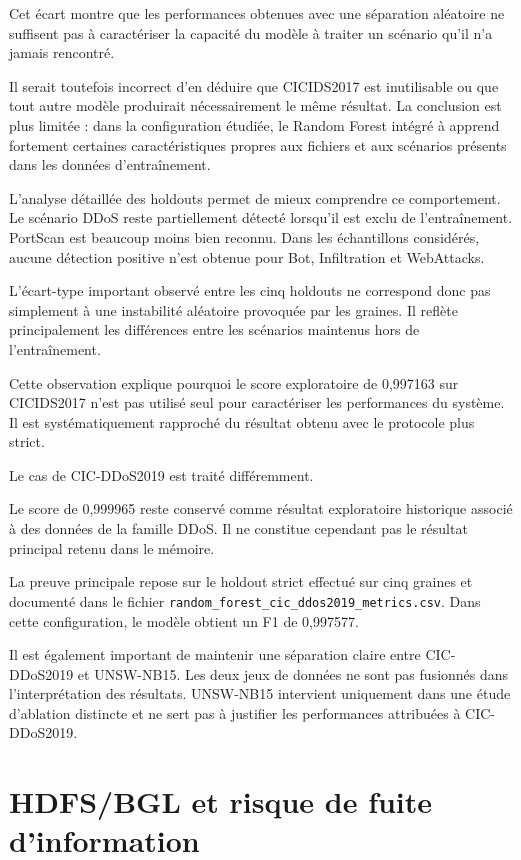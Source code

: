 Cet écart montre que les performances obtenues avec une séparation aléatoire ne suffisent pas à caractériser la capacité du modèle à traiter un scénario qu'il n'a jamais rencontré.

Il serait toutefois incorrect d'en déduire que CICIDS2017 est inutilisable ou que tout autre modèle produirait nécessairement le même résultat. La conclusion est plus limitée : dans la configuration étudiée, le Random Forest intégré à \logminer{} apprend fortement certaines caractéristiques propres aux fichiers et aux scénarios présents dans les données d'entraînement.

L'analyse détaillée des holdouts permet de mieux comprendre ce comportement. Le scénario DDoS reste partiellement détecté lorsqu'il est exclu de l'entraînement. PortScan est beaucoup moins bien reconnu. Dans les échantillons considérés, aucune détection positive n'est obtenue pour Bot, Infiltration et WebAttacks.

L'écart-type important observé entre les cinq holdouts ne correspond donc pas simplement à une instabilité aléatoire provoquée par les graines. Il reflète principalement les différences entre les scénarios maintenus hors de l'entraînement.

Cette observation explique pourquoi le score exploratoire de 0,997163 sur CICIDS2017 n'est pas utilisé seul pour caractériser les performances du système. Il est systématiquement rapproché du résultat obtenu avec le protocole plus strict.

Le cas de CIC-DDoS2019 est traité différemment.

Le score de 0,999965 reste conservé comme résultat exploratoire historique associé à des données de la famille DDoS. Il ne constitue cependant pas le résultat principal retenu dans le mémoire.

La preuve principale repose sur le holdout strict effectué sur cinq graines et documenté dans le fichier \texttt{random\_forest\_cic\_ddos2019\_metrics.csv}. Dans cette configuration, le modèle obtient un F1 de 0,997577.

Il est également important de maintenir une séparation claire entre CIC-DDoS2019 et UNSW-NB15. Les deux jeux de données ne sont pas fusionnés dans l'interprétation des résultats. UNSW-NB15 intervient uniquement dans une étude d'ablation distincte et ne sert pas à justifier les performances attribuées à CIC-DDoS2019.

\section{HDFS/BGL et risque de fuite d'information}

